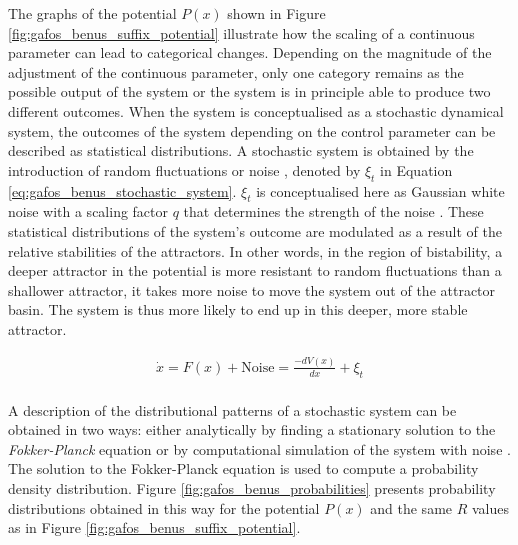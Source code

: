 The graphs of the potential $P(x)$ shown in Figure \ref{fig:gafos_benus_suffix_potential} illustrate how the scaling of a continuous parameter can lead to categorical changes. Depending on the magnitude of the adjustment of the continuous parameter, only one category remains as the possible output of the system or the system is in principle able to produce two different outcomes. When the system is conceptualised as a stochastic dynamical system, the outcomes of the system depending on the control parameter can be described as statistical distributions. A stochastic system is obtained by the introduction of random fluctuations or noise \citep{Haken1977}, denoted by $\xi_t$ in Equation \ref{eq:gafos_benus_stochastic_system}. $\xi_t$ is conceptualised here as Gaussian white noise with a scaling factor $q$ that determines the strength of the noise \citep{GafosBenus2006}. These statistical distributions of the system's outcome are modulated as a result of the relative stabilities of the attractors. In other words, in the region of bistability, a deeper attractor in the potential is more resistant to random fluctuations than a shallower attractor, it takes more noise to move the system out of the attractor basin. The system is thus more likely to end up in this deeper, more stable attractor.

\begin{equation}
\begin{split}
\dot{x} = F(x) + \text{Noise} = \frac{-dV(x)}{dx} + \xi_t\\
\end{split}
\label{eq:gafos_benus_stochastic_system}
\end{equation}

A description of the distributional patterns of a stochastic system can be obtained in two ways: either analytically by finding a stationary solution to the \emph{Fokker-Planck} equation \citep{Haken1977, FreidlinWentzell1984} or by computational simulation of the system with noise \citep{GafosBenus2006}. The solution to the Fokker-Planck equation is used to compute a probability density distribution. Figure \ref{fig:gafos_benus_probabilities} presents probability distributions obtained in this way for the potential $P(x)$ and the same $R$ values as in Figure \ref{fig:gafos_benus_suffix_potential}.

